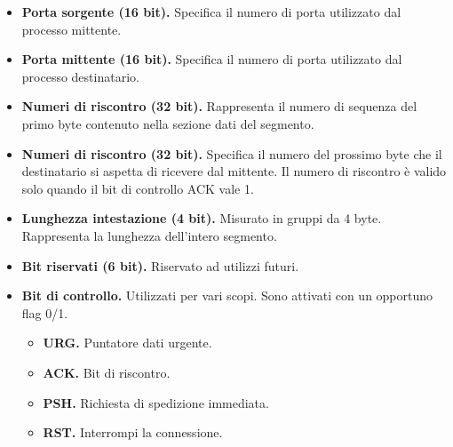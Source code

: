         \begin{itemize}
            \item 
                \textbf{Porta sorgente (16 bit).} Specifica il numero di porta utilizzato dal processo mittente.
                
            \item 
                \textbf{Porta mittente (16 bit).} Specifica il numero di porta utilizzato dal processo destinatario.
                
            \item 
                \textbf{Numeri di riscontro (32 bit).} Rappresenta il numero di sequenza del primo byte contenuto nella sezione dati del segmento.
                
            \item 
                \textbf{Numeri di riscontro (32 bit).} Specifica il numero del prossimo byte che il destinatario si aspetta di ricevere dal mittente. Il numero di riscontro è valido solo quando il bit di controllo ACK vale 1.
                
            \item 
                \textbf{Lunghezza intestazione (4 bit).} Misurato in gruppi da 4 byte. Rappresenta la lunghezza dell'intero segmento.
                
            \item 
                \textbf{Bit riservati (6 bit).} Riservato ad utilizzi futuri.
                
            \item 
                \textbf{Bit di controllo.} Utilizzati per vari scopi. Sono attivati con un opportuno flag 0/1.
                    \begin{itemize}
                        \item 
                            \textbf{URG.} Puntatore dati urgente.
                        
                        \item 
                            \textbf{ACK.} Bit di riscontro.
                            
                        \item 
                            \textbf{PSH.} Richiesta di spedizione immediata.
                            
                        \item 
                            \textbf{RST.} Interrompi la connessione.
                            

\end{itemize}
\end{itemize}
